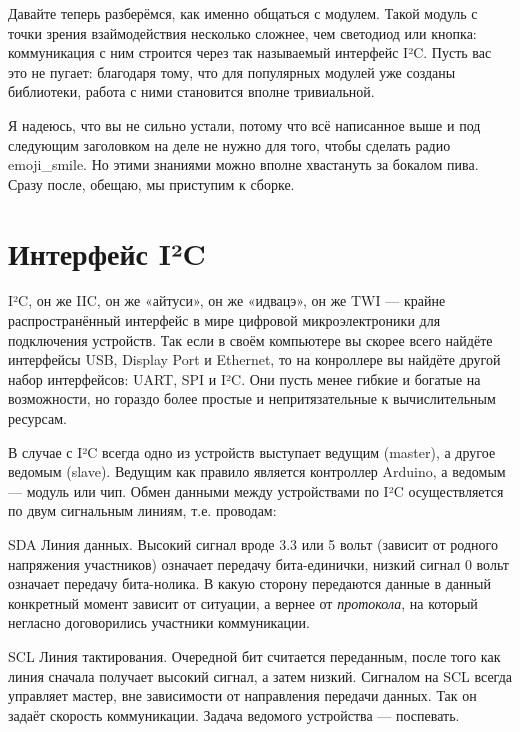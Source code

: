 Давайте теперь разберёмся, как именно общаться с модулем. Такой модуль с точки зрения взаймодействия несколько сложнее, чем светодиод или кнопка: коммуникация с ним строится через так называемый интерфейс I²C. Пусть вас это не пугает: благодаря тому, что для популярных модулей уже созданы библиотеки, работа с ними становится вполне тривиальной.

\begin{Note}
Я надеюсь, что вы не сильно устали, потому что всё написанное выше и под следующим заголовком на деле не нужно для того, чтобы сделать радио \textbar emoji\_smile\textbar. Но этими знаниями можно вполне хвастануть за бокалом пива. Сразу после, обещаю, мы приступим к сборке.
\end{Note}

\section{Интерфейс I²C}

I²C, он же IIC, он же «айтуси», он же «идвацэ», он же TWI — крайне распространённый интерфейс в мире цифровой микроэлектроники для подключения устройств. Так если в своём компьютере вы скорее всего найдёте интерфейсы USB, Display Port и Ethernet, то на конроллере вы найдёте другой набор интерфейсов: UART, SPI и I²C. Они пусть менее гибкие и богатые на возможности, но гораздо более простые и непритязательные к вычислительным ресурсам.

В случае с I²C всегда одно из устройств выступает ведущим (master), а другое ведомым (slave). Ведущим как правило является контроллер Arduino, а ведомым — модуль или чип. Обмен данными между устройствами по I²C осуществляется по двум сигнальным линиям, т.е. проводам:


SDA Линия данных. Высокий сигнал вроде 3.3 или 5 вольт (зависит от родного напряжения участников) означает передачу бита-единички, низкий сигнал 0 вольт означает передачу бита-нолика. В какую сторону передаются данные в данный конкретный момент зависит от ситуации, а вернее от \emph{протокола}, на который негласно договорились участники коммуникации.

SCL Линия тактирования. Очередной бит считается переданным, после того как линия сначала получает высокий сигнал, а затем низкий. Сигналом на SCL всегда управляет мастер, вне зависимости от направления передачи данных. Так он задаёт скорость коммуникации. Задача ведомого устройства — поспевать.

